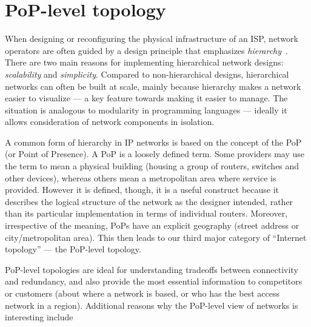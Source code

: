 \clearpage
\section{PoP-level topology}


When designing or reconfiguring the physical infrastructure of an ISP, network 
operators are often guided by a design principle that emphasizes 
{\em hierarchy}~\cite{Cisco05,Gill,Morris07}.  There are two main reasons 
for implementing hierarchical network designs: {\em scalability} and {\em simplicity}.  
Compared to non-hierarchical designs, hierarchical networks can often be built at scale, 
mainly because hierarchy makes a network easier to visualize --- a key feature towards 
making it easier to manage. The situation is analogous to modularity in programming 
languages --- ideally it allows consideration of network components in isolation.

A common form of hierarchy in IP networks is based on the concept of the PoP (or 
Point of Presence). A PoP is a loosely defined term. Some providers may use the 
term to mean a physical building (housing a group of routers, switches and other 
devices), whereas others mean a metropolitan area where service is provided. 
However it is defined, though, it is a useful construct because it describes 
the logical structure of the network as the designer intended, rather than its 
particular implementation in terms of individual routers. Moreover, irrespective 
of the meaning, PoPs have an explicit geography (\eg street address or 
city/metropolitan area).  This then leads to our third major category 
of ``Internet topology'' --- the PoP-level topology.

PoP-level topologies are ideal for understanding tradeoffs between connectivity 
and redundancy, and also provide the most essential information to competitors 
or customers (about where a network is based, or who has the best access network 
in a region).  Additional reasons why the PoP-level view of networks is interesting 
include

